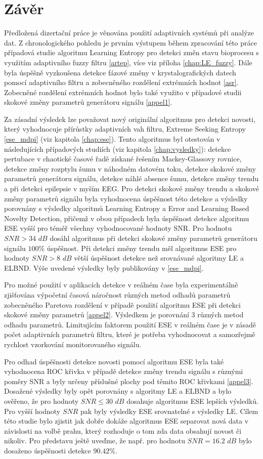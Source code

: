 \chapter{Závěr}
Předložená dizertační práce je věnována použití adaptivních systémů při analýze dat. Z chronologického pohledu je prvním výstupem během zpracování této práce případová studie algoritmu Learning Entropy pro detekci změn stavu bioprocesu s využitím adaptivního fuzzy filtru \ref{artep}, více viz příloha \ref{chap:LE_fuzzy}. Dále byla úspěšně vyzkoušena detekce fázové změny v krystalografických datech pomocí adaptivního filtru a zobecněného rozdělení extrémních hodnot \ref{asr}. Zobecněné rozdělení extrémních hodnot bylo také využito v případové studii skokové změny parametrů generátoru signálu \ref{appel1}. 
\par 
Za zásadní výsledek lze považovat nový originální algoritmus pro detekci novosti, který vyhodnocuje přírůstky adaptivních vah filtru, Extreme Seeking Entropy \ref{ese_mdpi} (viz kapitola \ref{chap:ese}). Tento algoritmus byl otestován v následujících případových studiích (viz kapitola \ref{chap:vysledky}): detekce pertubace v chaotické časové řadě získané řešením Mackey-Glassovy rovnice, detekce změny rozptylu šumu v náhodném datovém toku, detekce skokové změny parametrů generátoru signálu, detekce náhlé absence šumu, detekce změny trendu a při detekci epilepsie v myším EEG. Pro detekci skokové změny trendu a skokové změny parametrů signálu byla vyhodnocena úspěšnost této detekce a výsledky porovnány s výsledky algoritmů Learning Entropy a Error and Learning Based Novelty Detection, přičemž v obou případech byla úspěšnost detekce algoritmu ESE vyšší pro téměř všechny vyhodnocované hodnoty SNR. Pro hodnotu $SNR>34$ $dB$ dosáhl algoritmus při detekci skokové změny parametrů generátoru signálu $100\%$ úspěšnost. Při detekci změny trendu měl algoritmus ESE pro hodnoty $SNR>8$ $dB$ větší úspěšnost detekce než srovnávané algoritmy LE a ELBND. Výše uvedené výsledky byly publikovány v \ref{ese_mdpi}.
\par Pro možné použití v aplikacích detekce v reálném čase byla experimentálně zjišťována výpočetní časová náročnost různých metod odhadů parametrů zobecněného Paretova rozdělení v případě použití algoritmu ESE při detekci skokové změny parametrů \ref{appel2}. Výsledkem je porovnání 3 různých metod odhadu parametrů. Limitujícím faktorem použití ESE v reálném čase je v zásadě počet adaptivních parametrů filtru, které je potřeba vyhodnocovat a samozřejmě rychlost vzorkování monitorovaného signálu.
\par Pro odhad úspěšnosti detekce novosti pomocí algoritmu ESE byla také vyhodnocena ROC křivka v případě detekce změny trendu signálu s různými poměry SNR a byly určeny příslušné plochy pod těmito ROC křivkami \ref{appel3}. Dosažené výsledky byly opět porovnány s algoritmy LE a ELBND a bylo ověřeno, že pro hodnoty $SNR \leq 30$ $dB$ dosahuje algoritmus ESE lepších výsledků. Pro vyšší hodnoty $SNR$ pak byly výsledky ESE srovnatelné s výsledky LE.  Cílem této studie bylo zjistit jak dobře dokáže algoritmus ESE separovat nová data v závislosti na volbě prahu, který rozhoduje o tom zda data obsahují novost či nikoliv. Pro představu ještě uveďme, že např. pro hodnotu $SNR=16.2$ $dB$ bylo dosaženo úspěšnosti detekce $90.42\%$.
